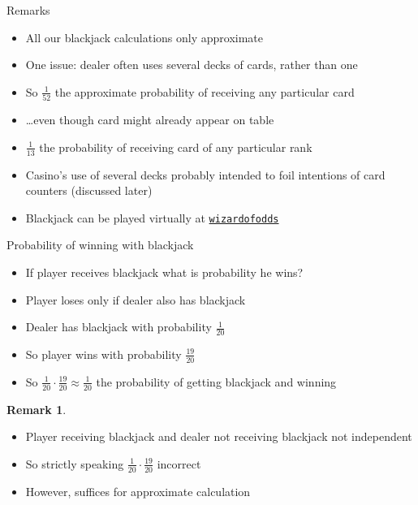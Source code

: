 \documentclass[handout]{beamer}
\theoremstyle{definition}
\newtheorem{remark}{Remark}
\begin{document}
\begin{frame}{Remarks}
\begin{itemize}
\item All our blackjack calculations only approximate
\item One issue: dealer often uses several decks of cards, rather than one
\item So $\frac{1}{52}$ the
approximate probability of receiving any particular card
\item \dots even though card might already appear on table
\item $\frac{1}{13}$ the probability of receiving card
of any particular rank
\item Casino's use of several decks probably intended to foil
intentions of \alert{card counters} (discussed later)
\item Blackjack can be played virtually at
\href{http://wizardofodds.com/play/blackjack}{\color{blue}\tt wizardofodds}
\end{itemize}
\end{frame}

\begin{frame}{Probability of winning with blackjack}
\begin{itemize}
\item If player receives blackjack
what is probability he wins?
\item Player loses only if dealer also has blackjack
\item Dealer has blackjack with probability $\textstyle\frac{1}{20}$
\item So player wins with probability $\textstyle\frac{19}{20}$
\item So $\frac{1}{20}\cdot\frac{19}{20}
\approx\frac{1}{20}$ the probability of getting blackjack and winning
\end{itemize}
\begin{remark}
\begin{itemize}
\item Player receiving blackjack and dealer not receiving blackjack
not independent
\item So strictly speaking 
$\frac{1}{20}\cdot\frac{19}{20}$ incorrect
\item However, suffices for approximate calculation
\end{itemize}
\end{remark}
\end{frame}
\end{document}
